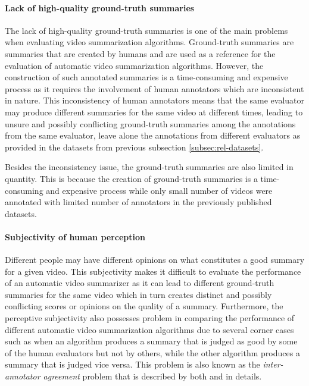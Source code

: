 			\paragraph[short]{Lack of high-quality ground-truth summaries}
				The lack of high-quality ground-truth summaries is one of the main problems when evaluating video summarization algorithms. Ground-truth summaries are summaries that are created by humans and are used as a reference for the evaluation of automatic video summarization algorithms. However, the construction of such annotated summaries is a time-consuming and expensive process as it requires the involvement of human annotators which are inconsistent in nature. This inconsistency of human annotators means that the same evaluator may produce different summaries for the same video at different times, leading to unsure and possibly conflicting ground-truth summaries among the annotations from the same evaluator, leave alone the annotations from different evaluators as provided in the datasets from previous subsection \ref{subsec:rel-datasets}.

				Besides the inconsistency issue, the ground-truth summaries are also limited in quantity. This is because the creation of ground-truth summaries is a time-consuming and expensive process while only small number of videos were annotated with limited number of annotators in the previously published datasets.
			
			\paragraph[short]{Subjectivity of human perception}
				Different people may have different opinions on what constitutes a good summary for a given video. This subjectivity makes it difficult to evaluate the performance of an automatic video summarizer as it can lead to different ground-truth summaries for the same video which in turn creates distinct and possibly conflicting scores or opinions on the quality of a summary. Furthermore, the perceptive subjectivity also possesses problem in comparing the performance of different automatic video summarization algorithms due to several corner cases such as when an algorithm produces a summary that is judged as good by some of the human evaluators but not by others, while the other algorithm produces a summary that is judged vice versa. This problem is also known as the \textit{inter-annotator agreement} problem that is described by both \cite{measure-annotator-agreement} and \cite{inter-annotator-agreement} in details.
			
